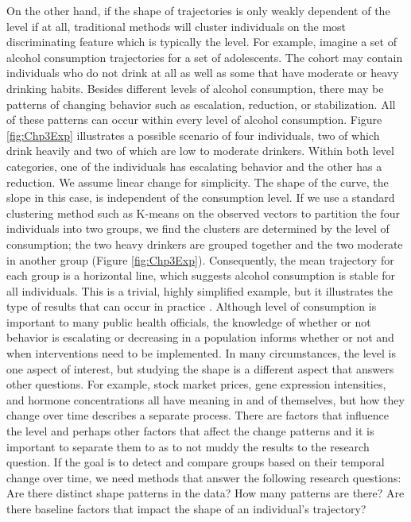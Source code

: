 \documentclass[12pt]{article}
\begin{document}
On the other hand, if the shape of trajectories is only weakly dependent of the level if at all, traditional methods will cluster individuals on the most discriminating feature which is typically the level. For example, imagine a set of alcohol consumption trajectories for a set of adolescents. The cohort may contain individuals who do not drink at all as well as some that have moderate or heavy drinking habits. Besides different levels of alcohol consumption, there may be patterns of changing behavior such as escalation, reduction, or stabilization. All of these patterns can occur within every level of alcohol consumption. Figure \ref{fig:Chp3Exp} illustrates a possible scenario of four individuals, two of which drink heavily and two of which are low to moderate drinkers. Within both level categories, one of the individuals has escalating behavior and the other has a reduction. We assume linear change for simplicity. The shape of the curve, the slope in this case, is independent of the consumption level. If we use a standard clustering method such as K-means on the observed vectors to partition the four individuals into two groups, we find the clusters are determined by the level of consumption; the two heavy drinkers are grouped together and the two moderate in another group (Figure \ref{fig:Chp3Exp}). Consequently, the mean trajectory for each group is a horizontal line, which suggests alcohol consumption is stable for all individuals. This is a trivial, highly simplified example, but it illustrates the type of results that can occur in practice \cite{mccoy2010}. Although level of consumption is important to many public health officials, the knowledge of whether or not behavior is escalating or decreasing in a population informs whether or not and when interventions need to be implemented. In many circumstances, the level is one aspect of interest, but studying the shape is a different aspect that answers other questions. For example, stock market prices, gene expression intensities, and hormone concentrations all have meaning in and of themselves, but how they change over time describes a separate process. There are factors that influence the level and perhaps other factors that affect the change patterns and it is important to separate them to as to not muddy the results to the research question. If the goal is to detect and compare groups based on their temporal change over time, we need methods that answer the following research questions: Are there distinct shape patterns in the data? How many patterns are there? Are there baseline factors that impact the shape of an individual's trajectory?\\\\
\end{document}
